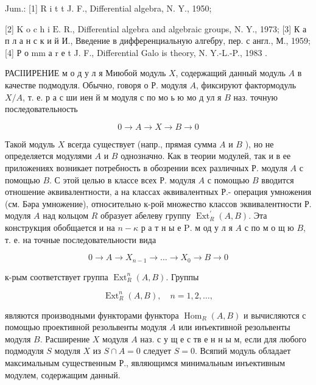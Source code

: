 \documentclass[10pt]{article}
\begin{document}
Jum.: [1] R i t t J. F., Differential algebra, N. Y., 1950;

[2] K o c $\mathrm{h}$ i $\mathrm{E}$. R., Differential algebra and algebraic groups, N. Y., 1973; [3] К а п л а н с к и й И., Введение в дифференциальную алгебру, пер. с англ., М., 1959; [4] Р о $\mathrm{m} \mathrm{m}$ а r е t J. F., Differential Galo is theory, N. Y.-L.-P., 1983 .



РАСІІИРЕНИЕ м о д у л я Миюбой модуль $X$, содержащий данный модуль $A$ в качестве подмодуля. Обычно, говоря о Р. модуля $A$, фиксируют фактормодуль $X / A$, т. е. р а с ши иен й м модуля с по мо ь ю мо д ул я $B$ наз. точную последовательность



\[

0 \longrightarrow A \longrightarrow X \longrightarrow B \longrightarrow 0

\]



Такой модуль $X$ всегда существует (напр., прямая сумма $A$ и $B$ ), но не определяется модулями $A$ и $B$ однозначно. Как в теории модулей, так и в ее приложениях возникает потребность в обозрении всех различных Р. модуля $A$ с помощью $B$. С этой целью в классе всех Р. модуля $A$ с помощью $B$ вводится отношение әквивалентности, а на классах әквивалентных Р.- операция умножения (см. Бәра умножение), относительно к-рой множество классов эквивалентности Р. модуля $A$ над кольцом $R$ образует абелеву группу $\operatorname{Ext}_{R}^{\prime}(A, B)$. Эта конструкция обобщается и на $n-\kappa$ р а т н ы е $\mathrm{P}$. м од у л я $A$ с по м о щ ю $B$, т. е. на точные последовательности вида



\[

0 \longrightarrow A \longrightarrow X_{n-1} \longrightarrow \ldots \longrightarrow X_{0} \rightarrow B \longrightarrow 0

\]



к-рым соответствует группа $\operatorname{Ext}_{R}^{n}(A, B)$. Группы



\[

\operatorname{Ext}_{R}^{n}(A, B), \quad n=1,2, \ldots,

\]



являются производными функторами функтора $\operatorname{Hom}_{R}(A, B)$ и вычисляются с помощью проективной резольвенты модуля $A$ или инъективной резольвенты модуля $B$. Расширение $X$ модуля $A$ наз. с у щ е с тв е н н ы м, если для любого подмодуля $S$ модуля $X$ из $S \cap A=0$ следует $S=0$. Всяпий модуль обладает максимальным существенным Р., являющимся минимальным инъективным модулем, содержащим данный.
\end{document}
